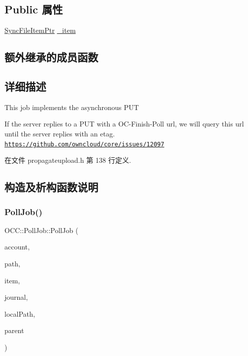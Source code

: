 \subsection*{Public 属性}
\begin{DoxyCompactItemize}
\item 
\hyperlink{namespace_o_c_c_acb6b0db82893659fbd0c98d3c5b8e2b8}{Sync\+File\+Item\+Ptr} \hyperlink{class_o_c_c_1_1_poll_job_a7b1fed343646c920b2e0508ccc476e4b}{\+\_\+item}
\end{DoxyCompactItemize}
\subsection*{额外继承的成员函数}


\subsection{详细描述}
This job implements the asynchronous P\+UT 

If the server replies to a P\+UT with a O\+C-\/\+Finish-\/\+Poll url, we will query this url until the server replies with an etag. \href{https://github.com/owncloud/core/issues/12097}{\tt https\+://github.\+com/owncloud/core/issues/12097} 

在文件 propagateupload.\+h 第 138 行定义.



\subsection{构造及析构函数说明}
\mbox{\label{class_o_c_c_1_1_poll_job_adca9f0109f3ecec23b7abd3af0d1d290}} 
\subsubsection{\texorpdfstring{Poll\+Job()}{PollJob()}}
{\footnotesize\ttfamily O\+C\+C\+::\+Poll\+Job\+::\+Poll\+Job (\begin{DoxyParamCaption}\item[{\hyperlink{namespace_o_c_c_a848616aedb9188e223c6b9867757fe69}{Account\+Ptr}}]{account,  }\item[{const Q\+String \&}]{path,  }\item[{const \hyperlink{namespace_o_c_c_acb6b0db82893659fbd0c98d3c5b8e2b8}{Sync\+File\+Item\+Ptr} \&}]{item,  }\item[{\hyperlink{class_o_c_c_1_1_sync_journal_db}{Sync\+Journal\+Db} $\ast$}]{journal,  }\item[{const Q\+String \&}]{local\+Path,  }\item[{Q\+Object $\ast$}]{parent }\end{DoxyParamCaption})\hspace{0.3cm}{\ttfamily [explicit]}}



